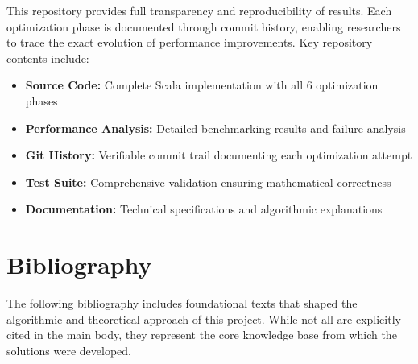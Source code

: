 \documentclass[12pt,a4paper]{article}
\theoremstyle{definition}
\begin{document}
This repository provides full transparency and reproducibility of results. Each optimization phase is documented through commit history, enabling researchers to trace the exact evolution of performance improvements. Key repository contents include:

\begin{itemize}
\item \textbf{Source Code:} Complete Scala implementation with all 6 optimization phases
\item \textbf{Performance Analysis:} Detailed benchmarking results and failure analysis
\item \textbf{Git History:} Verifiable commit trail documenting each optimization attempt
\item \textbf{Test Suite:} Comprehensive validation ensuring mathematical correctness
\item \textbf{Documentation:} Technical specifications and algorithmic explanations
\end{itemize}

\section*{Bibliography}

The following bibliography includes foundational texts that shaped the algorithmic and theoretical approach of this project. While not all are explicitly cited in the main body, they represent the core knowledge base from which the solutions were developed.
\end{document}
